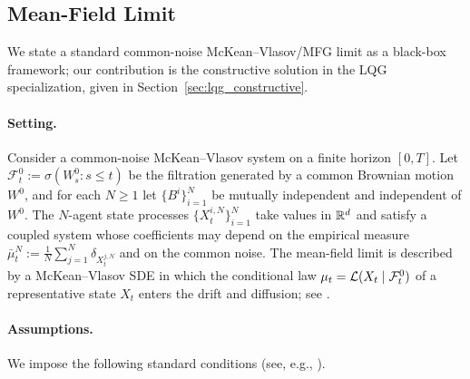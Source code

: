 
\subsection{Mean-Field Limit}\label{sec:mf_limit}

We state a standard common-noise McKean--Vlasov/MFG limit as a black-box framework; our contribution is the constructive solution in the LQG specialization, given in Section~\ref{sec:lqg_constructive}.

\paragraph{Setting.}
Consider a common-noise McKean--Vlasov system on a finite horizon $[0,T]$. Let $\mathcal{F}^0_t := \sigma(W^0_s: s\le t)$ be the filtration generated by a common Brownian motion $W^0$, and for each $N\ge 1$ let $\{B^i\}_{i=1}^N$ be mutually independent and independent of $W^0$. The $N$-agent state processes $\{X^{i,N}_t\}_{i=1}^N$ take values in $\mathbb{R}^d$ and satisfy a coupled system whose coefficients may depend on the empirical measure $\bar\mu^N_t := \frac{1}{N}\sum_{j=1}^N \delta_{X^{j,N}_t}$ and on the common noise. The mean-field limit is described by a McKean--Vlasov SDE in which the conditional law $\mu_t = \mathcal{L}(X_t\mid \mathcal{F}^0_t)$ of a representative state $X_t$ enters the drift and diffusion; see \cite{CarmonaDelarueMFGVol1,CarmonaDelarueMFGVol2,Lacker2018}.

\paragraph{Assumptions.}
We impose the following standard conditions (see, e.g., \cite{FournierGuillin2015,Lacker2018}).

